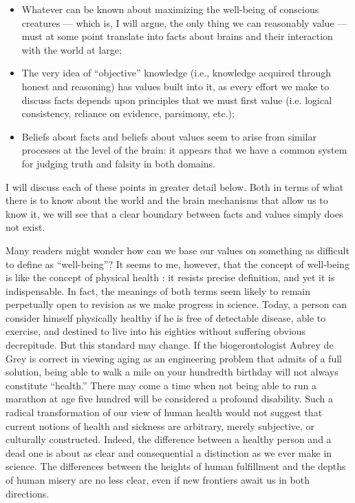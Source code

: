 \documentclass[a4paper,12pt]{extbook}
\begin{document}
\begin{itemize}

    \item
          Whatever can be known about maximizing the well-being of conscious creatures --- which is, I will argue, the only thing we can reasonably value --- must at some point translate into facts about brains and their interaction with the world at large;
    \item
          The very idea of ``objective'' knowledge (i.e., knowledge acquired through honest and reasoning) has values built into it, as every effort we make to discuss facts depends upon principles that we must first value (i.e. logical consistency, reliance on evidence, parsimony, etc.);
    \item
          Beliefs about facts and beliefs about values seem to arise from similar processes at the level of the brain:
          it appears that we have a common system for judging truth and falsity in both domains.

\end{itemize}


I will discuss each of these points in greater detail below.
Both in terms of what there is to know about the world and the brain mechanisms that allow us to know it, we will see that a clear boundary between facts and values simply does not exist.

Many readers might wonder how can we base our values on something as difficult to define as ``well-being''?
It seems to me, however, that the concept of well-being is like the concept of physical health :
it resists precise definition, and yet it is indispensable.
In fact, the meanings of both terms seem likely to remain perpetually open to revision as we make progress in science.
Today, a person can consider himself physically healthy if he is free of detectable disease, able to exercise, and destined to live into his eighties without suffering obvious decrepitude.
But this standard may change.
If the biogerontologist Aubrey de Grey is correct in viewing aging as an engineering problem that admits of a full solution, being able to walk a mile on your hundredth birthday will not always constitute ``health.''
There may come a time when not being able to run a marathon at age five hundred will be considered a profound disability.
Such a radical transformation of our view of human health would not suggest that current notions of health and sickness are arbitrary, merely subjective, or culturally constructed.
Indeed, the difference between a healthy person and a dead one is about as clear and consequential a distinction as we ever make in science.
The differences between the heights of human fulfillment and the depths of human misery are no less clear, even if new frontiers await us in both directions.
\end{document}

